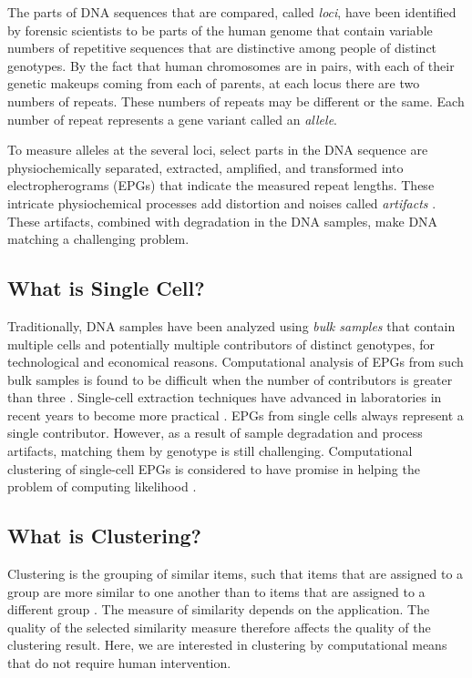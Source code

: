 The parts of DNA sequences that are compared, called \emph{loci}, have been identified by forensic scientists to be parts of the human genome that contain variable numbers of repetitive sequences that are distinctive among people of distinct genotypes. By the fact that human chromosomes are in pairs, with each of their genetic makeups coming from each of parents, at each locus there are two numbers of repeats. These numbers of repeats may be different or the same. Each number of repeat represents a gene variant called an \emph{allele}.

To measure alleles at the several loci, select parts in the DNA sequence are physiochemically separated, extracted, amplified, and transformed into electropherograms (EPGs) that indicate the measured repeat lengths. These intricate physiochemical processes add distortion and noises called \emph{artifacts} \cite{duffy_exploring_2017}. These artifacts, combined with degradation in the DNA samples, make DNA matching a challenging problem.

\subsection{What is Single Cell?}

Traditionally, DNA samples have been analyzed using \emph{bulk samples} that contain multiple cells and potentially multiple contributors of distinct genotypes, for technological and economical reasons. Computational analysis of EPGs from such bulk samples is found to be difficult when the number of contributors is greater than three \cite{swaminathan_noc_2015}\cite{swaminathan_ceesit_2016}. Single-cell extraction techniques have advanced in laboratories in recent years to become more practical \cite{sheth_towards_2021}. EPGs from single cells always represent a single contributor. However, as a result of sample degradation and process artifacts, matching them by genotype is still challenging. Computational clustering of single-cell EPGs is considered to have promise in helping the problem of computing likelihood \cite{odonnell_clustering_2021}.

\subsection{What is Clustering?}

Clustering is the grouping of similar items, such that items that are assigned to a group are more similar to one another than to items that are assigned to a different group \cite{aggarwal_cluster_2018}. The measure of similarity depends on the application. The quality of the selected similarity measure therefore affects the quality of the clustering result. Here, we are interested in clustering by computational means that do not require human intervention.


